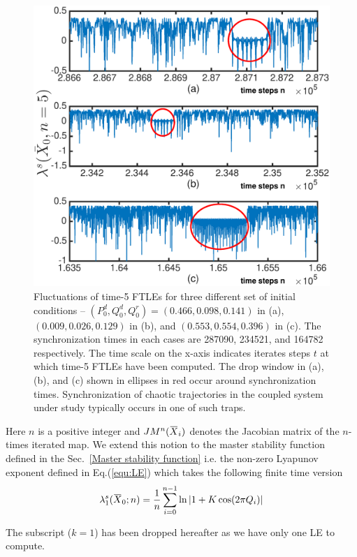 \documentclass[preprint,showpacs,preprintnumbers,amsmath,amssymb]{revtex4-1}
\newcommand{\overbar}[1]{\mkern 1.5mu\overline{\mkern-1.5mu#1\mkern-1.5mu}\mkern 1.5mu}
\begin{document}
\begin{figure}[h]
\includegraphics[scale=0.55]{FTLE_plots}
\caption{\label{fig:FTLE}\footnotesize Fluctuations of time-5 FTLEs for three different set of initial conditions -- $(P^d_0,Q^d_0,Q^r_0) = (0.466,0.098,0.141)$ in (a),  $(0.009,0.026,0.129)$ in (b), and $(0.553,0.554,0.396)$ in (c). The synchronization times in each cases are 287090, 234521, and 164782 respectively. The time scale on the x-axis indicates iterates steps $t$ at which time-5 FTLEs have been computed. The drop window in (a), (b), and (c) shown in ellipses in red occur around synchronization times. Synchronization of chaotic trajectories in the coupled system under study typically occurs in one of such traps.}
\end{figure}


Here $n$ is a positive integer and $JM^n(\overbar{X}_i)$ denotes the Jacobian matrix of the $n$-times iterated map. We extend this notion to the master stability function defined in the Sec.~\ref{Master stability function}  i.e.  the non-zero Lyapunov exponent defined in Eq.(\ref{equ:LE}) 
which takes the following finite time version 
\begin{equation}
\lambda_1^s(\overbar{X}_0;n) = \frac{1}{n}\sum^{n-1}_{i=0}\ln|1 + K \cos (2\pi Q_i)|
\end{equation}

The subscript ($k = 1$) has been dropped hereafter as we have only one LE to compute.
\end{document}
